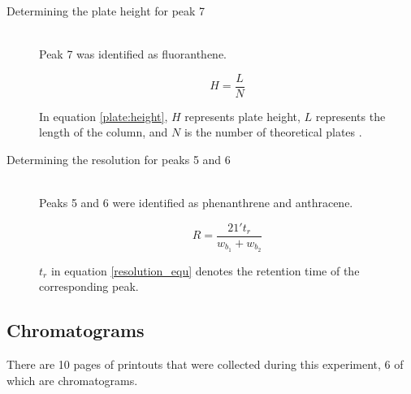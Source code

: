 \documentclass[a4paper, 12pt]{article}
\begin{document}
\begin{description}
\item[Determining the plate height for peak 7] \hfill \\
	Peak 7 was identified as fluoranthene.

	\begin{equation} \label{plate:height}
		H = \frac{L}{N}
	\end{equation}

		In equation \ref{plate:height}, $H$ represents plate height, $L$ represents the length of the column, and $N$ is the number of theoretical plates \cite{harris_quantitative_2010}.

\item[Determining the resolution for peaks 5 and 6] \hfill \\
Peaks 5 and 6 were identified as phenanthrene and anthracene.

\begin{equation} \label{resolution_equ}
R = \frac{21't_r}{w_{b_1} + w_{b_2}}
\end{equation}

\(t_r\) in equation \ref{resolution_equ} denotes the retention time of the corresponding peak.
\end{description}

\subsection{Chromatograms}
There are 10 pages of printouts that were collected during this experiment, 6 of which are chromatograms.


\end{document}
